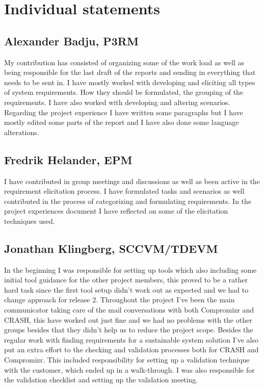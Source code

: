 \documentclass[10pt]{article}
\begin{document}
\section{Individual statements}
\noindent
{}
\subsection{Alexander Badju, P3RM}
My contribution has consisted of organizing some of the work load as well as being responsible for the last draft of the reports and sending in everything that needs to be sent in. I have mostly worked with developing and eliciting all types of system requirements. How they should be formulated, the grouping of the requirements. I have also worked with developing and altering scenarios. Regarding the project experience I have written some paragraphs but I have mostly edited some parts of the report and I have also done some language alterations.
\subsection{Fredrik Helander, EPM}
I have contributed in group meetings and discussions as well as been active in the requirement elicitation process. I have formulated tasks and scenarios as well contributed in the process of categorizing and formulating requirements. In the project experiences document I have reflected on some of the elicitation techniques used.
\subsection{Jonathan Klingberg, SCCVM/TDEVM}
In the beginning I was responsible for setting up tools which also including some initial tool guidance for the other project members, this proved to be a rather hard task since the first tool setup didn't work out as expected and we had to change approach for release 2. Throughout the project I've been the main communicator taking care of the mail conversations with both Compromizr and CRASH, this have worked out just fine and we had no problems with the other groups besides that they didn't help us to reduce the project scope. Besides the regular work with finding requirements for a sustainable system solution I've also put an extra effort to the checking and validation processes both for CRASH and Compromizr. This included responsibility for setting up a validation technique with the customer, which ended up in a walk-through. I was also responsible for the validation checklist and setting up the validation meeting.
\end{document}

